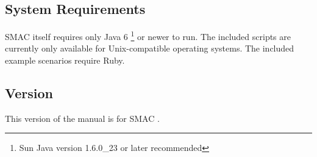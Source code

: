 \subsection{System Requirements}

SMAC itself requires only Java 6 \footnote{Sun Java version 1.6.0\_23 or later recommended} or newer to run. The included scripts are currently only available for Unix-compatible operating systems. The included example scenarios require Ruby. 

\subsection{Version}
This version of the manual is for SMAC $\!\!$.
